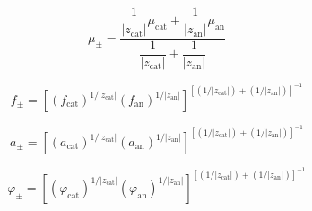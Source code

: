 \documentclass[12pt, letterpaper]{article}
\begin{document}
\begin{equation}
    \mu_{\pm}
    =
    \frac{\dfrac{1}{|z_{\mathrm{cat}}|}\mu_{\mathrm{cat}}+\dfrac{1}{|z_{\mathrm{an}}|}\mu_{\mathrm{an}}}
    {\dfrac{1}{|z_{\mathrm{cat}}|}+\dfrac{1}{|z_{\mathrm{an}}|}}
    \label{eq:mu_pm_charge}
\end{equation}


\begin{equation}
    f_{\pm}
    =
    \left[
        \left(f_{\mathrm{cat}}\right)^{1/|z_{\mathrm{cat}}|}
        \left(f_{\mathrm{an}}\right)^{1/|z_{\mathrm{an}}|}
    \right]^{\!\left[\left(1/|z_{\mathrm{cat}}|\right)+\left(1/|z_{\mathrm{an}}|\right)\right]^{-1}}
    \label{eq:f_pm_charge}
\end{equation}


\begin{equation}
    a_{\pm}
    =
    \left[
        \left(a_{\mathrm{cat}}\right)^{1/|z_{\mathrm{cat}}|}
        \left(a_{\mathrm{an}}\right)^{1/|z_{\mathrm{an}}|}
    \right]^{\!\left[\left(1/|z_{\mathrm{cat}}|\right)+\left(1/|z_{\mathrm{an}}|\right)\right]^{-1}}
    \label{eq:a_pm_charge}
\end{equation}


\begin{equation}
    \varphi_{\pm}
    =
    \left[
        \left(\varphi_{\mathrm{cat}}\right)^{1/|z_{\mathrm{cat}}|}
        \left(\varphi_{\mathrm{an}}\right)^{1/|z_{\mathrm{an}}|}
    \right]^{\!\left[\left(1/|z_{\mathrm{cat}}|\right)+\left(1/|z_{\mathrm{an}}|\right)\right]^{-1}}
    \label{eq:phi_pm_charge}
\end{equation}
\end{document}
